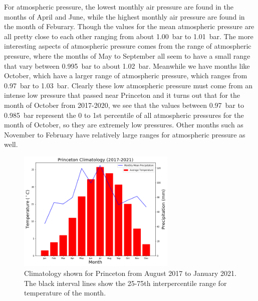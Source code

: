 \documentclass[11pt]{report}
\begin{document}
For atmospheric pressure, the lowest monthly air pressure are found in the months of April and June, while the highest monthly air pressure are found in the month of Feburary. Though the values for the mean atmospheric pressure are all pretty close to each other ranging from about 1.00~bar to 1.01~bar. The more interesting aspects of atmospheric pressure comes from the range of atmospheric pressure, where the months of May to September all seem to have a small range that vary between 0.995~bar to about 1.02~bar. Meanwhile we have months like October, which have a larger range of atmospheric pressure, which ranges from 0.97~bar to 1.03~bar. Clearly these low atmospheric pressure must come from an intense low pressure that passed near Princeton and it turns out that for the month of October from 2017-2020, we see that the values between 0.97~bar to 0.985~bar represent the 0 to 1st percentile of all atmospheric pressures for the month of October, so they are extremely low pressures. Other months such as November to February have relatively large ranges for atmospheric pressure as well. 
\clearpage
\begin{figure}[b]
	\centering
	\includegraphics[width=0.675\textwidth]{Figures/Climate1.png}
	\caption[Climatology of temperature and precipitation of Princeton (2017- 2021)]{\label{Clim1} Climatology shown for Princeton from August 2017 to January 2021. The black interval lines show the 25-75th interpercentile range for temperature of the month. }
\end{figure}
\end{document}
